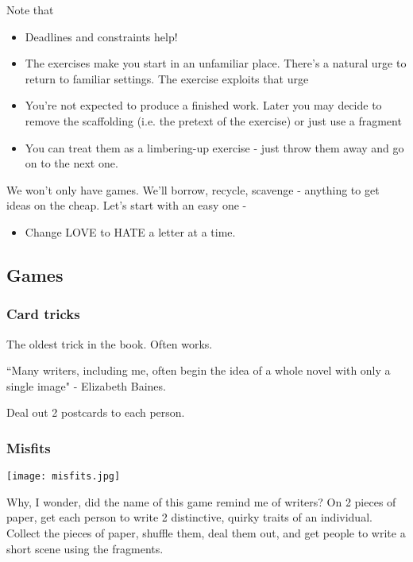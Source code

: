 \documentclass[11pt]{article}
\begin{document}
Note that
\begin{itemize}
\item Deadlines and constraints help!
\item The exercises make you start in an unfamiliar place. There's a natural urge to return to familiar settings. The exercise exploits that urge
\item You're not expected to produce a finished work. Later you may decide to remove the scaffolding (i.e. the pretext of the exercise) or just use a fragment 
\item You can treat them as a limbering-up exercise - just throw them away and go on to the next one. 
\end{itemize}

We won't only have games. We'll borrow, recycle, scavenge - anything to get ideas on the cheap. Let's start with an easy one -

\begin{itemize}
\item Change LOVE to HATE a letter at a time. 
\end{itemize}

\subsection*{Games}
\subsubsection*{Card tricks}
The oldest trick in the book. Often works.

``Many writers, including me, often begin the idea of a whole novel with only a single image" - Elizabeth Baines. 

Deal out 2 postcards to each person.


\subsubsection*{Misfits}

\texttt{[image: misfits.jpg]}

Why, I wonder, did the name of this game remind me of writers? On 2 pieces of paper, get each person to write 2 distinctive, quirky traits of an individual. Collect the pieces of paper, shuffle them, deal them out, and get people to write a short scene using the fragments.
\end{document}
